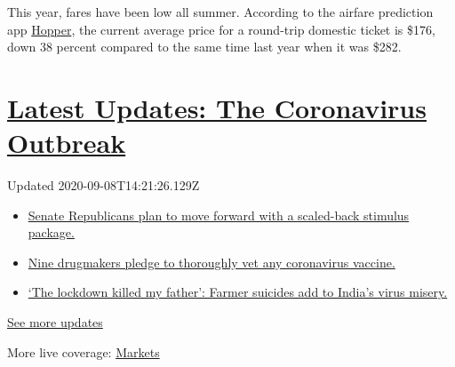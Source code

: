 This year, fares have been low all summer. According to the airfare
prediction app \href{https://www.hopper.com/}{Hopper}, the current
average price for a round-trip domestic ticket is \$176, down 38 percent
compared to the same time last year when it was \$282.

\hypertarget{latest-updates-the-coronavirus-outbreak}{%
\section{\texorpdfstring{\href{https://www.nytimes3xbfgragh.onion/2020/09/08/world/covid-19-coronavirus.html?action=click\&pgtype=Article\&state=default\&region=MAIN_CONTENT_1\&context=storylines_live_updates}{Latest
Updates: The Coronavirus
Outbreak}}{Latest Updates: The Coronavirus Outbreak}}\label{latest-updates-the-coronavirus-outbreak}}

Updated 2020-09-08T14:21:26.129Z

\begin{itemize}
\tightlist
\item
  \href{https://www.nytimes3xbfgragh.onion/2020/09/08/world/covid-19-coronavirus.html?action=click\&pgtype=Article\&state=default\&region=MAIN_CONTENT_1\&context=storylines_live_updates\#link-547feae1}{Senate
  Republicans plan to move forward with a scaled-back stimulus package.}
\item
  \href{https://www.nytimes3xbfgragh.onion/2020/09/08/world/covid-19-coronavirus.html?action=click\&pgtype=Article\&state=default\&region=MAIN_CONTENT_1\&context=storylines_live_updates\#link-679303d7}{Nine
  drugmakers pledge to thoroughly vet any coronavirus vaccine.}
\item
  \href{https://www.nytimes3xbfgragh.onion/2020/09/08/world/covid-19-coronavirus.html?action=click\&pgtype=Article\&state=default\&region=MAIN_CONTENT_1\&context=storylines_live_updates\#link-1c973131}{`The
  lockdown killed my father': Farmer suicides add to India's virus
  misery.}
\end{itemize}

\href{https://www.nytimes3xbfgragh.onion/2020/09/08/world/covid-19-coronavirus.html?action=click\&pgtype=Article\&state=default\&region=MAIN_CONTENT_1\&context=storylines_live_updates}{See
more updates}

More live coverage:
\href{https://www.nytimes3xbfgragh.onion/live/2020/09/08/business/stock-market-today-coronavirus?action=click\&pgtype=Article\&state=default\&region=MAIN_CONTENT_1\&context=storylines_live_updates}{Markets}

